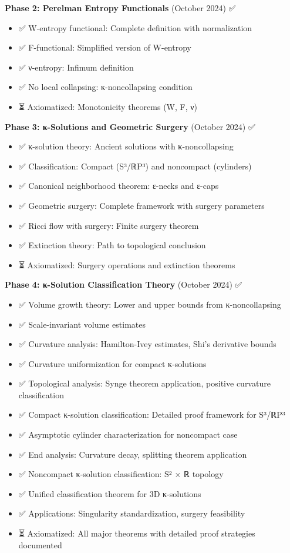 \textbf{Phase 2: Perelman Entropy Functionals} (October 2024) ✅

\begin{itemize}
\item ✅ W-entropy functional: Complete definition with normalization
\item ✅ F-functional: Simplified version of W-entropy
\item ✅ ν-entropy: Infimum definition
\item ✅ No local collapsing: κ-noncollapsing condition
\item ⏳ Axiomatized: Monotonicity theorems (W, F, ν)
\end{itemize}

\textbf{Phase 3: κ-Solutions and Geometric Surgery} (October 2024) ✅

\begin{itemize}
\item ✅ κ-solution theory: Ancient solutions with κ-noncollapsing
\item ✅ Classification: Compact (S³/ℝP³) and noncompact (cylinders)
\item ✅ Canonical neighborhood theorem: ε-necks and ε-caps
\item ✅ Geometric surgery: Complete framework with surgery parameters
\item ✅ Ricci flow with surgery: Finite surgery theorem
\item ✅ Extinction theory: Path to topological conclusion
\item ⏳ Axiomatized: Surgery operations and extinction theorems
\end{itemize}

\textbf{Phase 4: κ-Solution Classification Theory} (October 2024) ✅

\begin{itemize}
\item ✅ Volume growth theory: Lower and upper bounds from κ-noncollapsing
\item ✅ Scale-invariant volume estimates
\item ✅ Curvature analysis: Hamilton-Ivey estimates, Shi's derivative bounds
\item ✅ Curvature uniformization for compact κ-solutions
\item ✅ Topological analysis: Synge theorem application, positive curvature classification
\item ✅ Compact κ-solution classification: Detailed proof framework for S³/ℝP³
\item ✅ Asymptotic cylinder characterization for noncompact case
\item ✅ End analysis: Curvature decay, splitting theorem application
\item ✅ Noncompact κ-solution classification: S² × ℝ topology
\item ✅ Unified classification theorem for 3D κ-solutions
\item ✅ Applications: Singularity standardization, surgery feasibility
\item ⏳ Axiomatized: All major theorems with detailed proof strategies documented
\end{itemize}

